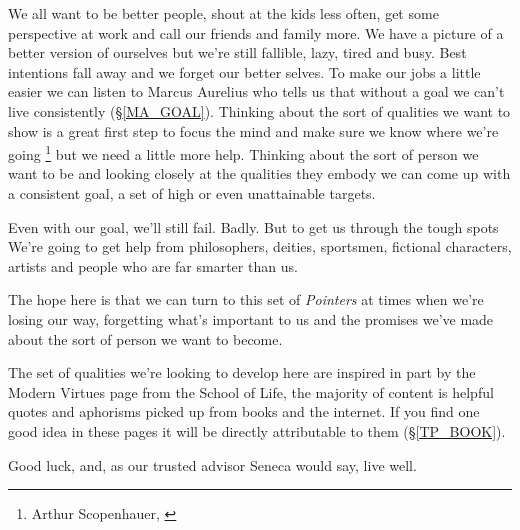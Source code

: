 \cleardoublepage
{\small
We all want to be better people, shout at the kids less often, get some perspective at work and call our friends and family more. We have a picture of a better version of ourselves but we're still fallible, lazy, tired and busy. Best intentions fall away and we forget our better selves. 
To make our jobs a little easier we can listen to Marcus Aurelius who tells us that without a goal we can't live consistently (\S \ref{MA_GOAL}). Thinking about the sort of qualities we want to show is a great first step to focus the mind and make sure we know where we're going \footnote{Arthur Scopenhauer, \cite{SCM}} but we need a little more help. Thinking about the sort of person we want to be and looking closely at the qualities they embody we can come up with a consistent goal, a set of high or even unattainable targets. 

Even with our goal, we'll still fail. Badly. But to get us through the tough spots We're going to get help from philosophers, deities, sportsmen, fictional characters, artists and people who are far smarter than us. 

The hope here is that we can turn to this set of \emph{Pointers} at times when we're losing our way, forgetting what's important to us and the promises we've made about the sort of person we want to become.

The set of qualities we're looking to develop here are inspired in part by the Modern Virtues page from the School of Life, the majority of content is helpful quotes and aphorisms picked up from books and the internet. If you find one good idea in these pages it will be directly attributable to them (\S \ref{TP_BOOK}). 

Good luck, and, as our trusted advisor Seneca would say, live well.

}